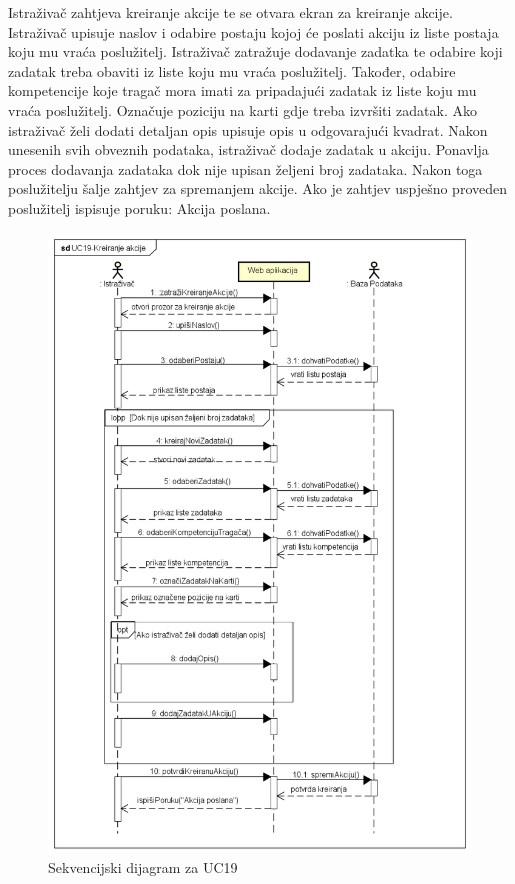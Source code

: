 				Istraživač zahtjeva kreiranje akcije te se otvara ekran za kreiranje akcije. Istraživač upisuje naslov i odabire postaju kojoj će poslati akciju iz liste postaja koju mu vraća poslužitelj. Istraživač zatražuje dodavanje zadatka te odabire koji zadatak treba obaviti iz liste koju mu vraća poslužitelj. Također, odabire kompetencije koje tragač mora imati za pripadajući zadatak iz liste koju mu vraća poslužitelj. Označuje poziciju na karti gdje treba izvršiti zadatak. Ako istraživač želi dodati detaljan opis upisuje opis u odgovarajući kvadrat. Nakon unesenih svih obveznih podataka, istraživač dodaje zadatak u akciju. Ponavlja proces dodavanja zadataka dok nije upisan željeni broj zadataka. Nakon toga poslužitelju šalje zahtjev za spremanjem akcije. Ako je zahtjev uspješno proveden poslužitelj ispisuje poruku: Akcija poslana.
				\begin{figure}[H]
					\includegraphics[width=\textwidth]{slike/UC19-KreiranjeAkcije.png} %
					\caption{Sekvencijski dijagram za UC19}
					\label{fig:promjene2} %
				\end{figure}
				\eject
				
